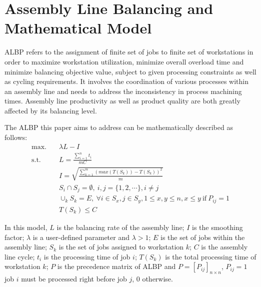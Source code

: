 \section{Assembly Line Balancing and Mathematical Model}
ALBP refers to the assignment of finite set of jobs to finite set of workstations in order to maximize workstation utilization, minimize overall overload time and minimize balancing objective value, subject to given processing constraints as well as cycling requirements.
It involves the coordination of various processes within an assembly line and needs to address the inconsistency in process machining times.
Assembly line productivity as well as product quality are both greatly affected by its balancing level.

The ALBP this paper aims to address can be mathematically described as follows:
\begin{align}
	\text{max.} \quad & \lambda L - I \\
	\text{s.t.} \quad & L = \frac{\sum_{i=1}^{n} t_i}{mC} \\
	& I = \sqrt{\frac{\sum_{k=1}^{m} (max(T(S_k)) - T(S_k))^2}{m}} \\
	& S_i \cap S_j = \emptyset, \ i, j = \{1, 2, \cdots\}, i \neq j \\
	& \cup_k S_k = E, \ \forall i \in S_x, j \in S_y, 1 \leq x, y \leq n, x \leq y \  \text{if} \  P_{ij} = 1 \\
	& T(S_k) \leq C 
\end{align}

In this model, $L$ is the balancing rate of the assembly line; $I$ is the smoothing factor; $\lambda$ is a user-defined parameter and $\lambda > 1$; $E$ is the set of jobs within the assembly line; $S_k$ is the set of jobs assigned to workstation $k$; $C$ is the assembly line cycle; $t_i$ is the processing time of job $i$; $T(S_k)$ is the total processing time of workstation $k$; $P$ is the precedence matrix of ALBP and $P = [P_{ij}]_{n\times n}$, $P_{ij} = 1$ job $i$ must be processed right before job $j$, 0 otherwise.